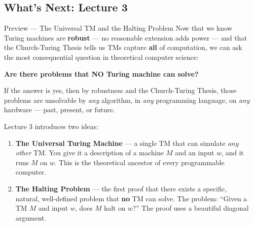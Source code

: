 \subsection{What's Next: Lecture 3}

\begin{conceptbox}{Preview --- The Universal TM and the Halting Problem}
Now that we know Turing machines are \textbf{robust} --- no reasonable extension adds power --- and that the Church-Turing Thesis tells us TMs capture \textbf{all} of computation, we can ask the most consequential question in theoretical computer science:

\begin{center}
\textbf{Are there problems that NO Turing machine can solve?}
\end{center}

If the answer is yes, then by robustness and the Church-Turing Thesis, those problems are unsolvable by \emph{any} algorithm, in \emph{any} programming language, on \emph{any} hardware --- past, present, or future.

Lecture 3 introduces two ideas:
\begin{enumerate}[nosep]
\item \textbf{The Universal Turing Machine} --- a single TM that can simulate \emph{any other} TM. You give it a description of a machine $M$ and an input $w$, and it runs $M$ on $w$. This is the theoretical ancestor of every programmable computer.
\item \textbf{The Halting Problem} --- the first proof that there exists a specific, natural, well-defined problem that \textbf{no} TM can solve. The problem: ``Given a TM $M$ and input $w$, does $M$ halt on $w$?'' The proof uses a beautiful diagonal argument.
\end{enumerate}

\end{conceptbox}
